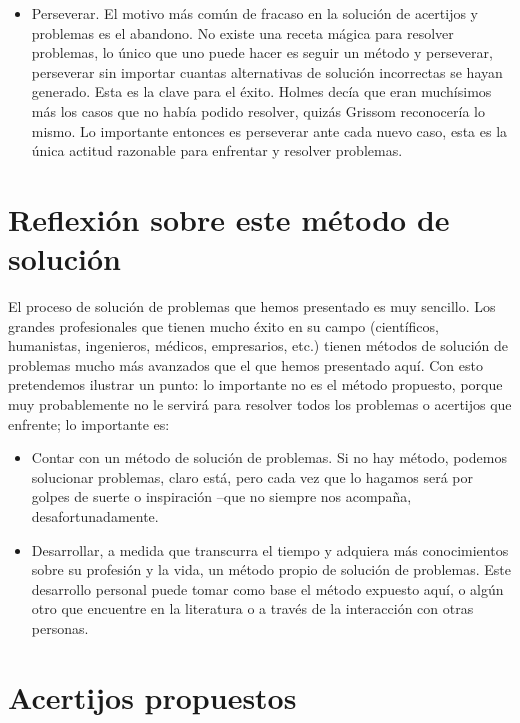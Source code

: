 \begin{itemize}
\item Perseverar. El motivo más común de fracaso en la solución de acertijos y 
problemas es el abandono. No existe una receta mágica para resolver problemas, 
lo único que uno puede hacer es seguir un método y perseverar, perseverar
sin importar cuantas alternativas de solución incorrectas se hayan generado.
Esta es la clave para el éxito. Holmes decía que eran muchísimos más los casos
que no había podido resolver, quizás Grissom reconocería lo mismo. Lo importante
entonces es perseverar ante cada nuevo caso, esta es la única actitud razonable
para enfrentar y resolver problemas.

\end{itemize}

\section{Reflexión sobre este método de solución}

El proceso de solución de problemas que hemos presentado es muy sencillo. Los grandes
profesionales que tienen mucho éxito en su campo (científicos, humanistas, 
ingenieros, médicos, empresarios, etc.) tienen métodos de solución de problemas mucho
más avanzados que el que hemos presentado aquí. Con esto pretendemos ilustrar un 
punto: lo importante no es el método propuesto, porque muy probablemente no le
servirá para resolver todos los problemas o acertijos que enfrente; lo importante
es:

\begin{itemize}

\item Contar con un método de solución de problemas. Si no hay método, podemos
 solucionar problemas, claro está, pero cada vez que lo hagamos será por golpes
de suerte o inspiración --que no siempre nos acompaña, desafortunadamente. 

\item Desarrollar, a medida que transcurra el tiempo y adquiera más conocimientos 
sobre su profesión y la vida, un método propio de solución de problemas. Este
 desarrollo personal puede tomar como base el método expuesto aquí, o algún otro
que encuentre en la literatura o a través de la interacción con otras 
personas.

\end{itemize}


\section{Acertijos propuestos}

